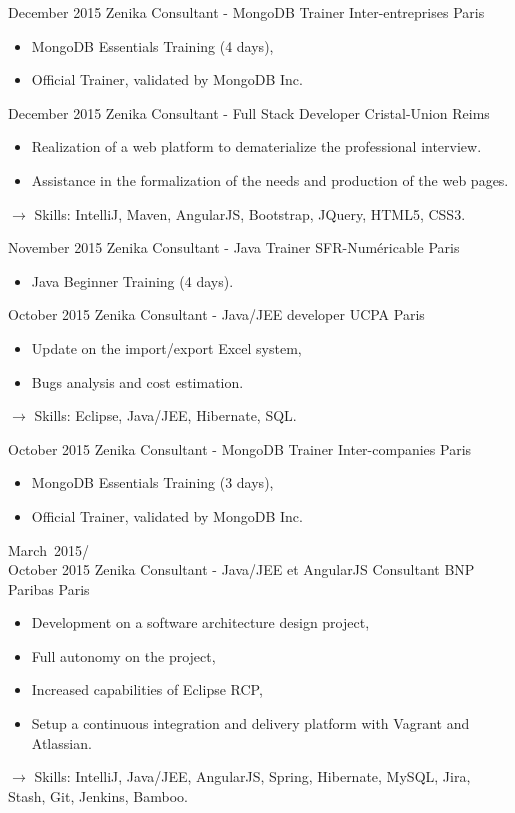 \documentclass[11pt,a4paper]{moderncv}
\begin{document}
\cventry
{December 2015}
{Zenika Consultant - MongoDB Trainer}
{Inter-entreprises}
{Paris}
{}
{\begin{itemize}
\item MongoDB Essentials Training (4 days),
\item Official Trainer, validated by MongoDB Inc.
\end{itemize}
}   %

\cventry
{December 2015}
{Zenika Consultant - Full Stack Developer}
{Cristal-Union}
{Reims}
{}
{\begin{itemize}
\item Realization of a web platform to dematerialize the professional interview. 
\item Assistance in the formalization of the needs and production of the web pages.
\end{itemize}
$\rightarrow$ Skills: IntelliJ, Maven, AngularJS, Bootstrap, JQuery, HTML5, CSS3.
}   %

\cventry
{November 2015}
{Zenika Consultant - Java Trainer}
{SFR-Numéricable}
{Paris}
{}
{\begin{itemize}
\item Java Beginner Training (4 days).
\end{itemize}
}   %

\cventry
{October 2015}
{Zenika Consultant - Java/JEE developer}
{UCPA}
{Paris}
{}
{\begin{itemize}
\item Update on the import/export Excel system,
\item Bugs analysis and cost estimation.
\end{itemize}
$\rightarrow$ Skills: Eclipse, Java/JEE, Hibernate, SQL.
}   %

\cventry
{October 2015}
{Zenika Consultant - MongoDB Trainer}
{Inter-companies}
{Paris}
{}
{\begin{itemize}
\item MongoDB Essentials Training (3 days),
\item Official Trainer, validated by MongoDB Inc.
\end{itemize}
}   %

\cventry
{March\ 2015/\\October 2015}
{Zenika Consultant - Java/JEE et AngularJS Consultant}
{BNP Paribas}
{Paris}
{}
{\begin{itemize}
\item Development on a software architecture design project,
\item Full autonomy on the project,
\item Increased capabilities of Eclipse RCP,
\item Setup a continuous integration and delivery platform with Vagrant and Atlassian.
\end{itemize}
$\rightarrow$ Skills: IntelliJ, Java/JEE, AngularJS, Spring, Hibernate, MySQL, Jira, Stash, Git, Jenkins, Bamboo.
}   %
\end{document}
